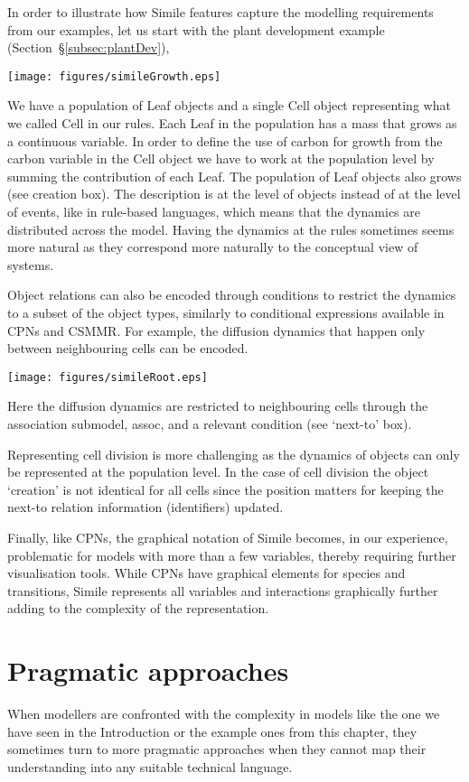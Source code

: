 \documentclass[phd]{infthesis}
\newcommand{\ssec}[1]{\S\ref{subsec:#1}}
\begin{document}
In order to illustrate how Simile features capture the modelling requirements from our
examples, let us start with the plant development example (Section~\ssec{plantDev}),
\begin{center}
  \texttt{[image: figures/simileGrowth.eps]}
\end{center}
We have a population of Leaf objects and a single Cell object representing
what we called $\mathrm{Cell}$ in our rules. Each Leaf in the population has a
mass that grows as a continuous variable. In order to define the use of carbon
for growth from the carbon variable in the Cell object we have to work at the
population level by summing the contribution of each Leaf. The population of
Leaf objects also grows (see creation box). The description is at the level of
objects instead of at the level of events, like in rule-based languages, which
means that the dynamics are distributed across the model. Having the dynamics at
the rules sometimes seems more natural as they correspond more naturally to the
conceptual view of systems.

Object relations can also be encoded through conditions to restrict the dynamics
to a subset of the object types, similarly to conditional expressions available
in CPNs and CSMMR. For example, the diffusion dynamics that happen only between
neighbouring cells can be encoded.
\begin{center}
  \texttt{[image: figures/simileRoot.eps]}
\end{center}
Here the diffusion dynamics are restricted to neighbouring cells through the
association submodel, assoc, and a relevant condition (see `next-to' box).

Representing cell division is more challenging as the dynamics of objects can
only be represented at the population level. In the case of cell division the object
`creation' is not identical for all cells since the position matters for keeping
the next-to relation information (identifiers) updated.

Finally, like CPNs, the graphical notation of Simile becomes, in our experience,
problematic for models with more than a few variables, thereby requiring further
visualisation tools. While CPNs have graphical elements for species and
transitions, Simile represents all variables and interactions graphically
further adding to the complexity of the representation.

\section{Pragmatic approaches}
When modellers are confronted with the complexity in models like the one we have
seen in the Introduction or the example ones from this chapter, they sometimes
turn to more pragmatic approaches when they cannot map their understanding into
any suitable technical language.
\end{document}

